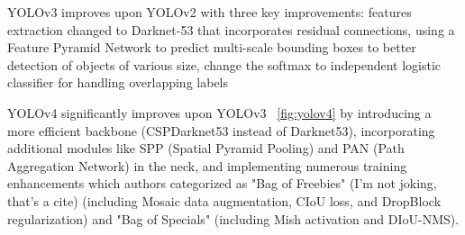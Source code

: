 \documentclass[12pt, a4paper]{article}
\begin{document}
YOLOv3 \cite{yolov3} improves upon YOLOv2 with three key improvements: features extraction changed to Darknet-53 that incorporates residual connections, using a Feature Pyramid Network \cite{featurepyramidnetwork} to predict multi-scale bounding boxes to better detection of objects of various size, change the softmax to independent logistic classifier for handling overlapping labels

YOLOv4 \cite{yolov4} significantly improves upon YOLOv3 ~\ref{fig:yolov4} by introducing a more efficient backbone (CSPDarknet53 instead of Darknet53), incorporating additional modules like SPP (Spatial Pyramid Pooling) and PAN (Path Aggregation Network) \cite{PAN} in the neck, and implementing numerous training enhancements which authors categorized as "Bag of Freebies" (I'm not joking, that's a cite) (including Mosaic data augmentation, CIoU loss, and DropBlock regularization) and "Bag of Specials" (including Mish activation and DIoU-NMS).
\end{document}
